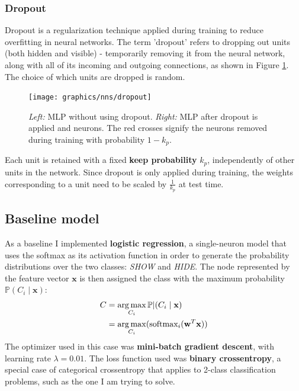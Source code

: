 	\subsubsection{Dropout} \label{Section: impl/ml/reg/dropout}
	Dropout\cite{dropout} is a regularization technique applied during training to reduce overfitting in neural networks. The term 'dropout' refers to  dropping out units (both hidden and visible) - temporarily removing it from the neural network, along with all of its incoming and outgoing connections, as shown in Figure \ref{Fig: impl/ml/dropout}. The choice of which units are dropped is random.
	\begin{figure}[H]
		\centering
		\texttt{[image: graphics/nns/dropout]}
		\caption{\textit{Left:} MLP without using dropout. \textit{Right:} MLP after dropout is applied and neurons. The red crosses signify the neurons removed during training with probability $1-k_p$.}
		\label{Fig: impl/ml/dropout}
	\end{figure}
	Each unit is retained with a fixed \textbf{keep probability} $k_p$, independently of other units in the network. Since dropout is only applied during training, the weights corresponding to a unit need to be scaled by $\frac{1}{k_p}$ at test time.
	
	\subsection{Baseline model} \label{Section: impl/ml/baseline}
	As a baseline I implemented \textbf{logistic regression}, a single-neuron model that uses the softmax as its activation function in order to generate the probability distributions over the two classes: \textit{SHOW} and \textit{HIDE}. The node represented by the feature vector $\textbf{x}$ is then assigned the class with the maximum probability $\mathbb{P}(C_i\mid \mathbf{x})$:
	\begin{equation}
	\centering
	\begin{split}
		C & = \argmax_{C_i} \mathbb{P}|(C_i\mid \mathbf{x}) \\
		  & = \argmax_{C_i} (\text{softmax}_i (\mathbf{w}^T\mathbf{x}))
	\end{split}
	\end{equation} 
	The optimizer used in this case was \textbf{mini-batch gradient descent}, with learning rate $\lambda = 0.01$. The loss function used was \textbf{binary crossentropy}, a special case of categorical crossentropy that applies to 2-class classification problems, such as the one I am trying to solve. 
	
